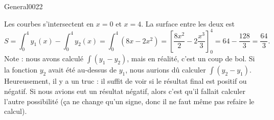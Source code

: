 \begin{corrige}{General0022}

Les courbes s'intersectent en $x=0$ et $x=4$. La surface entre les deux est
\begin{equation}
	S=\int_0^4y_1(x)-\int_0^4y_2(x)=\int_0^4(8x-2x^2)=\left[ \frac{ 8x^2 }{ 2 }-2\frac{ x^3 }{ 3 } \right]_0^4=64-\frac{ 128 }{ 3 }=\frac{ 64 }{ 3 }.
\end{equation}
Note : nous avons calculé $\int(y_1-y_2)$, mais en réalité, c'est un coup de bol. Si la fonction $y_2$ avait été au-dessus de $y_1$, nous aurions dû calculer $\int(y_2-y_1)$. Heureusement, il y a un truc : il suffit de voir si le résultat final est positif ou négatif. Si nous avions eut un résultat négatif, alors c'est qu'il fallait calculer l'autre possibilité (ça ne change qu'un signe, donc il ne faut même pas refaire le calcul).

\end{corrige}

